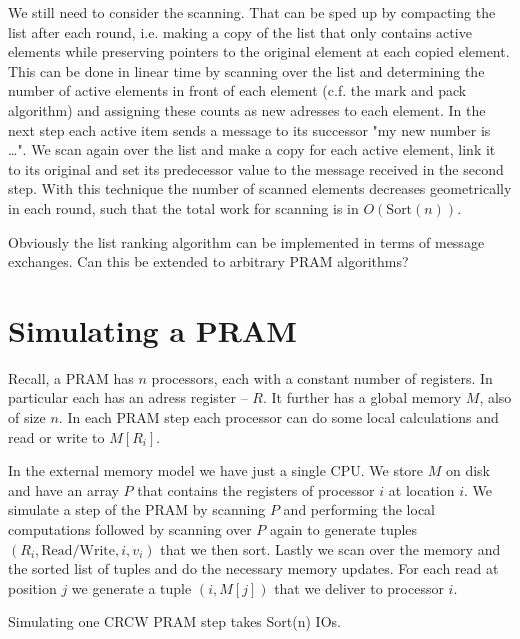 We still need to consider the scanning. That can be sped up by compacting the list after each round, i.e. making a copy of the list that only contains active elements while preserving pointers to the original element at each copied element. This can be done in linear time by scanning over the list and determining the number of active elements in front of each element (c.f. the mark and pack algorithm) and assigning these counts as new adresses to each element. In the next step each active item sends a message to its successor "my new number is \ldots". We scan again over the list and make a copy for each active element, link it to its original and set its predecessor value to the message received in the second step. With this technique the number of scanned elements decreases geometrically in each round, such that the total work for scanning is in $O(\text{Sort}(n))$.

Obviously the list ranking algorithm can be implemented in terms of message exchanges. Can this be extended to arbitrary PRAM algorithms?

\section{Simulating a PRAM}
	
Recall, a PRAM has $n$ processors, each with a constant number of registers. In particular each has an adress register -- $R$. It further has a global memory $M$, also of size $n$. In each PRAM step each processor can do some local calculations and read or write to $M[R_i]$.

In the external memory model we have just a single CPU. We store $M$ on disk and have an array $P$ that contains the registers of processor $i$ at location $i$. We simulate a step of the PRAM by scanning $P$ and performing the local computations followed by scanning over $P$ again to generate tuples $(R_i, \text{Read/Write}, i, v_i)$ that we then sort. Lastly we scan over the memory and the sorted list of tuples and do the necessary memory updates. For each read at position $j$ we generate a tuple $(i,M[j])$ that we deliver to processor $i$.

\begin{thm} Simulating one CRCW PRAM step takes Sort(n) IOs.\end{thm}